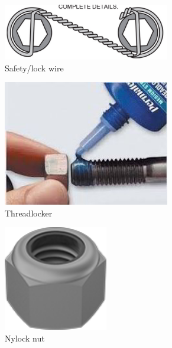 \documentclass[10pt,letterpaper]{book}
\begin{document}
	\begin{figure}[H]
		\centering
		\begin{subfigure}[b]{.24\linewidth}
			\includegraphics[width=0.8\textwidth]{imgs/lockwire.png}
			\caption{Safety/lock wire}
		\end{subfigure}\begin{subfigure}[b]{.24\linewidth}
			\includegraphics[width=0.8\textwidth]{imgs/threadlocker.jpeg}
			\caption{Threadlocker}
		\end{subfigure}\begin{subfigure}[b]{.24\linewidth}
			\includegraphics[width=0.5\textwidth]{imgs/nylock.png}
			\caption{Nylock nut}
		\end{subfigure}\begin{subfigure}[b]{.24\linewidth}

\end{subfigure}
\end{figure}
\end{document}
